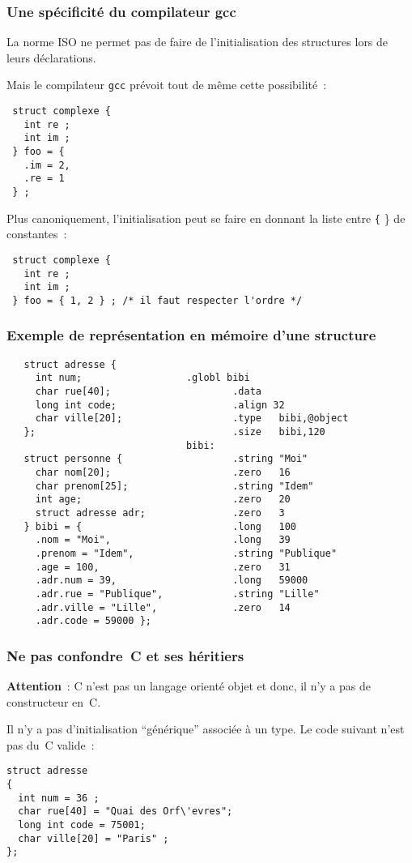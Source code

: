 \begin{frame}[fragile]
  \frametitle{Une sp\'ecificit\'e du compilateur gcc}%
  La norme ISO ne permet pas de faire de l'initialisation des
  structures lors de leurs d\'eclarations.
  \par\medskip
  Mais le compilateur \texttt{gcc} pr\'evoit tout de m\^eme cette
  possibilit\'e~:
\begin{verbatim}
 struct complexe {
   int re ;
   int im ;
 } foo = {
   .im = 2,
   .re = 1
 } ;
\end{verbatim}
  Plus canoniquement, l'initialisation peut se faire en donnant la
  liste entre {\tt \{} {\}} de constantes~:
\begin{verbatim}
 struct complexe {
   int re ;
   int im ;
 } foo = { 1, 2 } ; /* il faut respecter l'ordre */
\end{verbatim}
\end{frame}
\begin{frame}[fragile]
  \frametitle{Exemple de repr\'esentation en m\'emoire d'une structure}%
\begin{verbatim}
   struct adresse {                                         
     int num;                  .globl bibi                  
     char rue[40];                     .data                
     long int code;                    .align 32            
     char ville[20];                   .type   bibi,@object 
   };                                  .size   bibi,120     
                               bibi:                        
   struct personne {                   .string "Moi"        
     char nom[20];                     .zero   16           
     char prenom[25];                  .string "Idem"       
     int age;                          .zero   20           
     struct adresse adr;               .zero   3            
   } bibi = {                          .long   100          
     .nom = "Moi",                     .long   39           
     .prenom = "Idem",                 .string "Publique"   
     .age = 100,                       .zero   31           
     .adr.num = 39,                    .long   59000
     .adr.rue = "Publique",            .string "Lille"      
     .adr.ville = "Lille",             .zero   14           
     .adr.code = 59000 };      
\end{verbatim} 
\end{frame}
\begin{frame}[fragile]
  \frametitle{Ne pas confondre~C et ses h\'eritiers}%
  \textbf{Attention}~: C n'est pas un langage orient\'e objet et donc,
  il n'y a pas de constructeur en~C. 
  \par\medskip
  Il n'y a pas d'initialisation ``g\'en\'erique'' associ\'ee \`a un
  type. Le code suivant n'est pas du~C valide~:
\begin{verbatim}
struct adresse 
{
  int num = 36 ;
  char rue[40] = "Quai des Orf\'evres";
  long int code = 75001;
  char ville[20] = "Paris" ;
};
\end{verbatim}
\end{frame}
